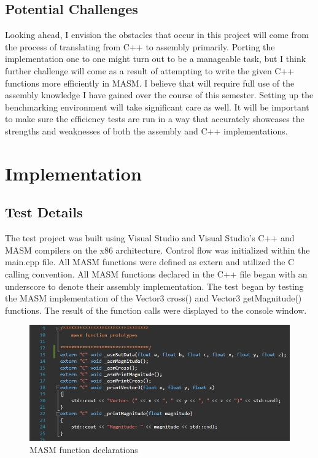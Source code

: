 \documentclass[12pt]{article}
\begin{document}
\subsection{Potential Challenges}\label{Potential Challenges}
\noindent Looking ahead, I envision the obstacles that occur in this project will come from the process of translating from C++ to assembly primarily. Porting the implementation one to one might turn out to be a manageable task, but I think further challenge will come as a result of attempting to write the given C++ functions more efficiently in MASM. I believe that will require full use of the assembly knowledge I have gained over the course of this semester. Setting up the benchmarking environment will take significant care as well. It will be important to make sure the efficiency tests are run in a way that accurately showcases the strengths and weaknesses of both the assembly and C++ implementations. 

\section{Implementation}
\subsection{Test Details}
The test project was built using Visual Studio and Visual Studio's C++ and MASM compilers on the x86 architecture. Control flow was initialized within the main.cpp file. All MASM functions were defined as extern and utilized the C calling convention. All MASM functions declared in the C++ file began with an underscore to denote their assembly implementation. The test began by testing the MASM implementation of the Vector3 cross() and Vector3 getMagnitude() functions. The result of the function calls were displayed to the console window. 
\newline
\newline

\begin{figure}[!htb]
  \centering
  \includegraphics[scale=0.7]{img/masm_func.PNG}
  \caption{MASM function declarations}
  \label{fig:masm_func}
\end{figure}
\end{document}
